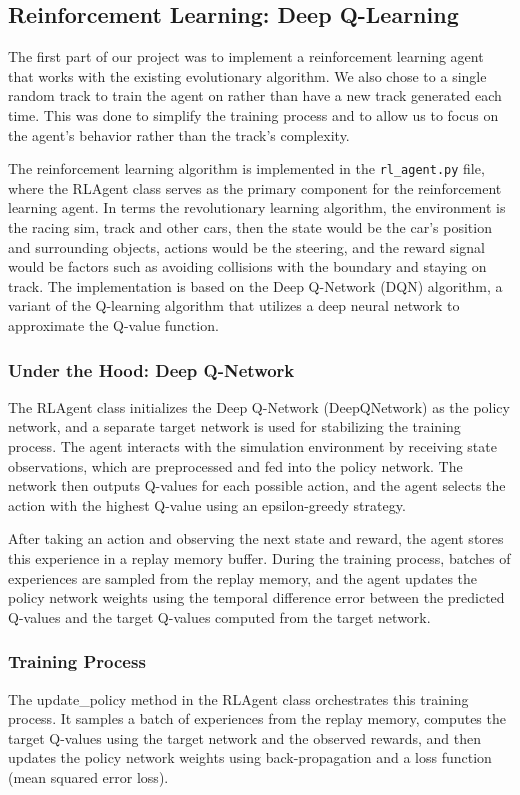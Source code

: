 \documentclass[12pt]{article}
\begin{document}
\subsection{Reinforcement Learning: Deep Q-Learning}

The first part of our project was to implement a reinforcement learning agent 
that works with the existing evolutionary algorithm. We also chose to a single 
random track to train the agent on rather than have a new track generated each
time. This was done to simplify the training process and to allow us to focus on
the agent's behavior rather than the track's complexity.

The reinforcement learning algorithm is implemented in the \texttt{rl\_agent.py} 
file, where the RLAgent class serves as the primary component for the 
reinforcement learning agent. In terms the revolutionary learning algorithm, 
the environment is the racing sim, track and other cars, then the state would 
be the car's position and surrounding objects, actions would be the steering, 
and the reward signal would be factors such as avoiding collisions with the 
boundary and staying on track. The implementation is based on the Deep Q-Network 
(DQN) algorithm, a variant of the Q-learning algorithm that utilizes a deep 
neural network to approximate the Q-value function.

\subsubsection{Under the Hood: Deep Q-Network}
The RLAgent class initializes the Deep Q-Network (DeepQNetwork) as the policy 
network, and a separate target network is used for stabilizing the training 
process. The agent interacts with the simulation environment by receiving 
state observations, which are preprocessed and fed into the policy network. 
The network then outputs Q-values for each possible action, and the agent 
selects the action with the highest Q-value using an epsilon-greedy strategy.

After taking an action and observing the next state and reward, the agent 
stores this experience in a replay memory buffer. During the training process, 
batches of experiences are sampled from the replay memory, and the agent 
updates the policy network weights using the temporal difference error between 
the predicted Q-values and the target Q-values computed from the target network.

\subsubsection{Training Process}
The update\_policy method in the RLAgent class orchestrates this training 
process. It samples a batch of experiences from the replay memory, computes 
the target Q-values using the target network and the observed rewards, and 
then updates the policy network weights using back-propagation and a loss 
function (mean squared error loss).
\end{document}
